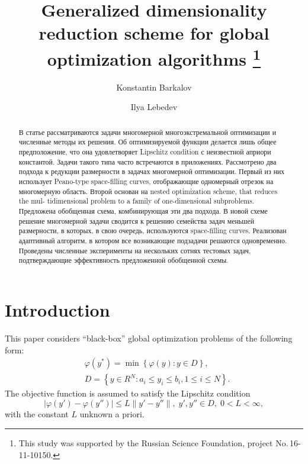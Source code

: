 \documentclass[runningheads]{llncs}
\begin{document}
%
\title{Generalized dimensionality reduction scheme for global optimization 
algorithms
\thanks{This study was supported by the Russian Science Foundation, project 
No.\,16-11-10150.}}
%
%
\author{Konstantin Barkalov %
\and Ilya Lebedev %
}
%
%
%
\maketitle              %
%
\begin{abstract}
\Russian
В статье рассматриваются задачи многомерной многоэкстремальной оптимизации и численные методы их решения. Об оптимизируемой функции делается лишь общее предположение, что она удовлетворяет Lipschitz condition с неизвестной априори константой. Задачи такого типа часто встречаются в приложениях. 
Рассмотрено два подхода к редукции размерности в задачах многомерной оптимизации. Первый из них использует Peano-type space-filling curves, отображающие одномерный отрезок на многомерную область. Второй основан на nested optimization scheme, that reduces the mul- tidimensional problem to a family of one-dimensional subproblems.
Предложена обобщенная схема, комбинирующая эти два подхода. В новой схеме решение многомерной задачи сводится к решению семейства задач меньшей размерности, в которых, в свою очередь, используются space-filling curves. Реализован адаптивный алгоритм, в котором все возникающие подзадачи решаются одновременно. 
Проведены численные эксперименты на нескольких сотнях тестовых задач, подтверждающие эффективность предложенной обобщенной схемы.

\end{abstract}
%
%
%
\section{Introduction}
This paper considers ``black-box'' global optimization problems of the 
following form:
\begin{eqnarray}\label{main_problem}
& \varphi(y^\ast)=\min{\left\{\varphi(y):y\in D\right\}},\\
& D=\left\{y\in R^N: a_i\leq y_i \leq b_i, 1\leq i \leq N\right\}. \nonumber
\end{eqnarray}
The objective function is assumed to satisfy the Lipschitz condition 
\[
\left|\varphi(y')-\varphi(y'')\right|\leq L\left\|y'-y''\right\|,\; y',y'' \in
 D,\; 0<L<\infty,
\]
with the constant $L$ unknown a priori.
\end{document}
